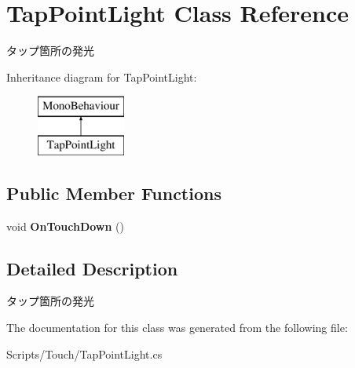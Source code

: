 \hypertarget{class_tap_point_light}{}\section{Tap\+Point\+Light Class Reference}
\label{class_tap_point_light}


タップ箇所の発光  


Inheritance diagram for Tap\+Point\+Light\+:\begin{figure}[H]
\begin{center}
\leavevmode
\includegraphics[height=2.000000cm]{class_tap_point_light}
\end{center}
\end{figure}
\subsection*{Public Member Functions}
\begin{DoxyCompactItemize}
\item 
void {\bfseries On\+Touch\+Down} ()\hypertarget{class_tap_point_light_a8d22c5920948cfac3451d81e9b150c90}{}\label{class_tap_point_light_a8d22c5920948cfac3451d81e9b150c90}

\end{DoxyCompactItemize}


\subsection{Detailed Description}
タップ箇所の発光 



The documentation for this class was generated from the following file\+:\begin{DoxyCompactItemize}
\item 
Scripts/\+Touch/Tap\+Point\+Light.\+cs\end{DoxyCompactItemize}
